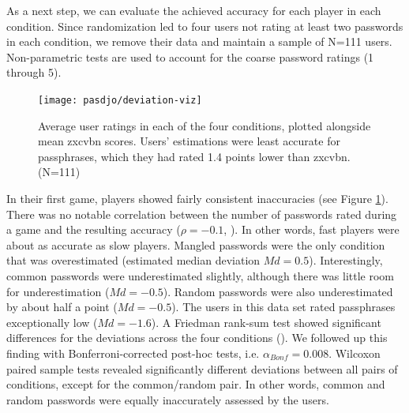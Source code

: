 As a next step, we can evaluate the achieved accuracy for each player in each condition. Since randomization led to four users not rating at least two passwords in each condition, we remove their data and maintain a sample of N=111 users. Non-parametric tests are used to account for the coarse password ratings (1 through 5). 

\begin{figure}[tbp]
	\centering
	\texttt{[image: pasdjo/deviation-viz]}
	\caption{\label{fig:pasdjo:deviation-viz} Average user ratings in each of the four conditions, plotted alongside mean zxcvbn scores. Users' estimations were least accurate for passphrases, which they had rated 1.4 points lower than zxcvbn. (N=111) }
\end{figure}

In their first game, players showed fairly consistent inaccuracies (see Figure \ref{fig:pasdjo:deviation-viz}).
There was no notable correlation between the number of passwords rated during a game and the resulting accuracy ($\rho=-0.1$, ). In other words, fast players were about as accurate as slow players. Mangled passwords were the only condition that was overestimated (estimated median deviation $Md=0.5$). Interestingly, common passwords were underestimated slightly, although there was little room for underestimation ($Md=-0.5$). Random passwords were also underestimated by about half a point ($Md=-0.5$). The users in this data set rated passphrases exceptionally low ($Md = -1.6$). A Friedman rank-sum test showed significant differences for the deviations across the four conditions (). We followed up this finding with Bonferroni-corrected post-hoc tests, i.e. $\alpha_{Bonf}=0.008$. Wilcoxon paired sample tests revealed significantly different deviations between all pairs of conditions, except for the common/random pair. In other words, common and random passwords were equally inaccurately assessed by the users. 

